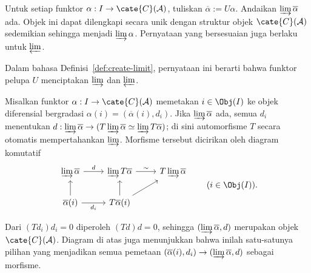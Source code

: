 \begin{lema}\label{prop:limits-cplx}
	Untuk setiap funktor $\alpha:I\to\cate{C}(\mathcal{A})$, tuliskan
	$\overline{\alpha}:=U\alpha$. Andaikan $\varinjlim\overline{\alpha}$ ada.
	Objek ini dapat dilengkapi secara unik dengan struktur objek
	$\cate{C}(\mathcal{A})$ sedemikian sehingga menjadi
	$\varinjlim\alpha$. Pernyataan yang bersesuaian juga berlaku untuk
	$\varprojlim$.

	Dalam bahasa Definisi~\ref{def:create-limit}, pernyataan ini berarti bahwa
	funktor pelupa $U$ menciptakan $\varinjlim$ dan $\varprojlim$.
\end{lema}
\begin{bukti}
	Misalkan funktor $\alpha:I\to\cate{C}(\mathcal{A})$ memetakan
	$i\in\Obj(I)$ ke objek diferensial bergradasi
	$\alpha(i)=(\overline{\alpha}(i),d_i)$. Jika
	$\varinjlim\overline{\alpha}$ ada, semua $d_i$ menentukan
	$d:\varinjlim\overline{\alpha}\to
	(T\varinjlim\overline{\alpha}\simeq
	\varinjlim T\overline{\alpha})$; di sini automorfisme $T$ secara otomatis
	mempertahankan $\varinjlim$. Morfisme tersebut dicirikan oleh diagram
	komutatif
	\[\begin{tikzcd}
		\varinjlim \overline{\alpha} \arrow[r, "d"] & \varinjlim T\overline{\alpha} \arrow[r, "\sim"] & T\varinjlim \overline{\alpha} \\
		\overline{\alpha}(i) \arrow[u] \arrow[r, "{d_i}"'] & T\overline{\alpha}(i) \arrow[u] \arrow[ru] &
	\end{tikzcd} \qquad (i \in \Obj(I)) . \]

	Dari $(Td_i)d_i=0$ diperoleh $(Td)d=0$, sehingga
	$(\varinjlim\overline{\alpha},d)$ merupakan objek
	$\cate{C}(\mathcal{A})$. Diagram di atas juga menunjukkan bahwa inilah
	satu-satunya pilihan yang menjadikan semua pemetaan
	$(\overline{\alpha}(i),d_i)\to
	(\varinjlim\overline{\alpha},d)$ sebagai morfisme.


\end{bukti}
